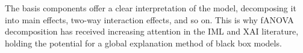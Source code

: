 The basis components offer a clear interpretation of the model, decomposing it into main effects, two-way interaction effects, and so on. This is why fANOVA decomposition has received increasing attention in the IML and XAI literature, holding the potential for a global explanation method of black box models.\par


